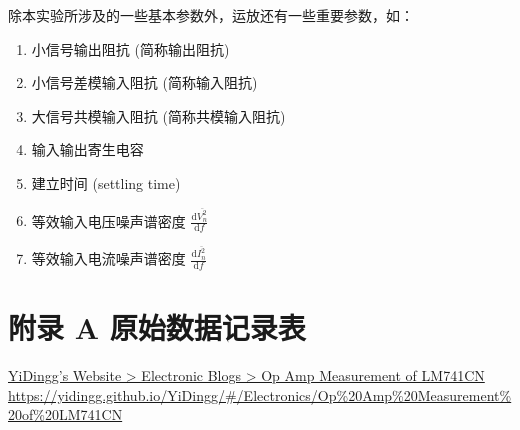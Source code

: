 \documentclass[UTF8]{article}
\begin{document}
\noindent 除本实验所涉及的一些基本参数外，运放还有一些重要参数，如：
\begin{enumerate}
\item 小信号输出阻抗 (简称输出阻抗)
\item 小信号差模输入阻抗 (简称输入阻抗)
\item 大信号共模输入阻抗 (简称共模输入阻抗)
\item 输入输出寄生电容
\item 建立时间 (settling time)
\item 等效输入电压噪声谱密度 $\frac{\mathrm{d} \overline{V_n^2} }{\mathrm{d} f }$
\item 等效输入电流噪声谱密度 $\frac{\mathrm{d} \overline{I_n^2} }{\mathrm{d} f }$
\end{enumerate}

















































\newpage
\section*{附录 A\hspace*{20pt} 原始数据记录表}
\thispagestyle{fancy} 

\noindent \href{https://yidingg.github.io/YiDingg/#/Electronics/Op\%20Amp\%20Measurement\%20of\%20LM741CN
}{ %
YiDingg's Website > Electronic Blogs > Op Amp Measurement of LM741CN
\\ 
\color{gray}\small https://yidingg.github.io/YiDingg/\#/Electronics/Op\%20Amp\%20Measurement\%20of\%20LM741CN
}
\end{document}
